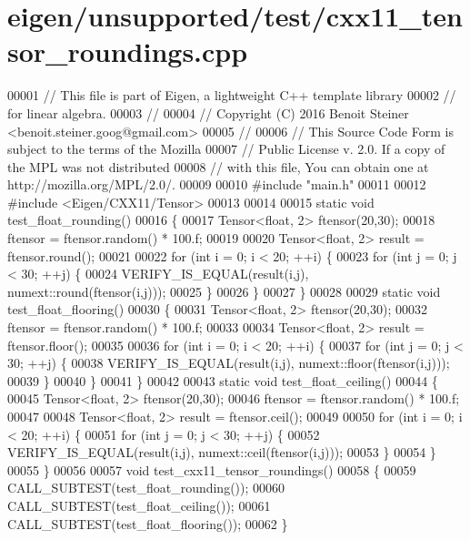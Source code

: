 \hypertarget{eigen_2unsupported_2test_2cxx11__tensor__roundings_8cpp_source}{}\section{eigen/unsupported/test/cxx11\+\_\+tensor\+\_\+roundings.cpp}
\label{eigen_2unsupported_2test_2cxx11__tensor__roundings_8cpp_source}

\begin{DoxyCode}
00001 \textcolor{comment}{// This file is part of Eigen, a lightweight C++ template library}
00002 \textcolor{comment}{// for linear algebra.}
00003 \textcolor{comment}{//}
00004 \textcolor{comment}{// Copyright (C) 2016 Benoit Steiner <benoit.steiner.goog@gmail.com>}
00005 \textcolor{comment}{//}
00006 \textcolor{comment}{// This Source Code Form is subject to the terms of the Mozilla}
00007 \textcolor{comment}{// Public License v. 2.0. If a copy of the MPL was not distributed}
00008 \textcolor{comment}{// with this file, You can obtain one at http://mozilla.org/MPL/2.0/.}
00009 
00010 \textcolor{preprocessor}{#include "main.h"}
00011 
00012 \textcolor{preprocessor}{#include <Eigen/CXX11/Tensor>}
00013 
00014 
00015 \textcolor{keyword}{static} \textcolor{keywordtype}{void} test\_float\_rounding()
00016 \{
00017   Tensor<float, 2> ftensor(20,30);
00018   ftensor = ftensor.random() * 100.f;
00019 
00020   Tensor<float, 2> result = ftensor.round();
00021 
00022   \textcolor{keywordflow}{for} (\textcolor{keywordtype}{int} i = 0; i < 20; ++i) \{
00023     \textcolor{keywordflow}{for} (\textcolor{keywordtype}{int} j = 0; j < 30; ++j) \{
00024       VERIFY\_IS\_EQUAL(result(i,j), numext::round(ftensor(i,j)));
00025     \}
00026   \}
00027 \}
00028 
00029 \textcolor{keyword}{static} \textcolor{keywordtype}{void} test\_float\_flooring()
00030 \{
00031   Tensor<float, 2> ftensor(20,30);
00032   ftensor = ftensor.random() * 100.f;
00033 
00034   Tensor<float, 2> result = ftensor.floor();
00035 
00036   \textcolor{keywordflow}{for} (\textcolor{keywordtype}{int} i = 0; i < 20; ++i) \{
00037     \textcolor{keywordflow}{for} (\textcolor{keywordtype}{int} j = 0; j < 30; ++j) \{
00038       VERIFY\_IS\_EQUAL(result(i,j), numext::floor(ftensor(i,j)));
00039     \}
00040   \}
00041 \}
00042 
00043 \textcolor{keyword}{static} \textcolor{keywordtype}{void} test\_float\_ceiling()
00044 \{
00045   Tensor<float, 2> ftensor(20,30);
00046   ftensor = ftensor.random() * 100.f;
00047 
00048   Tensor<float, 2> result = ftensor.ceil();
00049 
00050   \textcolor{keywordflow}{for} (\textcolor{keywordtype}{int} i = 0; i < 20; ++i) \{
00051     \textcolor{keywordflow}{for} (\textcolor{keywordtype}{int} j = 0; j < 30; ++j) \{
00052       VERIFY\_IS\_EQUAL(result(i,j), numext::ceil(ftensor(i,j)));
00053     \}
00054   \}
00055 \}
00056 
00057 \textcolor{keywordtype}{void} test\_cxx11\_tensor\_roundings()
00058 \{
00059    CALL\_SUBTEST(test\_float\_rounding());
00060    CALL\_SUBTEST(test\_float\_ceiling());
00061    CALL\_SUBTEST(test\_float\_flooring());
00062 \}
\end{DoxyCode}
